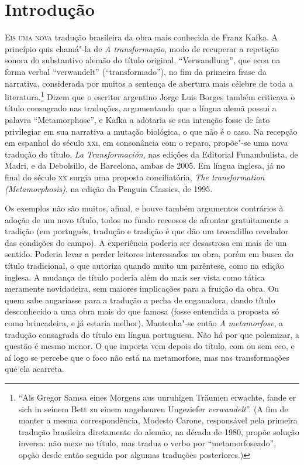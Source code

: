 
\chapter[Introdução, por Celso Donizete Cruz]{Introdução}

\textsc{Eis uma nova} tradução brasileira da obra mais conhecida de Franz Kafka.
A princípio quis chamá"-la de \textit{A transformação}, modo de
recuperar a repetição sonora do substantivo alemão do título original,
“Verwandlung”, que ecoa na forma verbal “verwandelt” (“transformado”),
no fim da primeira frase da narrativa, considerada por muitos a
sentença de abertura mais célebre de toda a literatura.\footnote{ “Als 
Gregor Samsa eines Morgens aus unruhigen
Träumen erwachte, fande er sich in seinem Bett zu einem ungeheuren
Ungeziefer \textit{verwandelt}”. (A fim de manter a mesma
correspondência, Modesto Carone, responsável pela primeira tradução
brasileira diretamente do alemão, na década de 1980,
propõe solução inversa: não mexe no título, mas traduz o verbo por
“metamorfoseado”, opção desde então seguida por algumas traduções
posteriores.)} Dizem que o escritor argentino Jorge Luis Borges também
criticava o título consagrado nas traduções, argumentando que a língua
alemã possui a palavra “Metamorphose”, e Kafka a adotaria se sua
intenção fosse de fato privilegiar em sua narrativa a mutação
biológica, o que não é o caso. Na recepção em espanhol do século \textsc{xxi}, em
consonância com o reparo, propõe"-se uma nova tradução do título,
\textit{La Transformación}, nas edições da Editorial Funambulista, de
Madri, e da Debolsillo, de Barcelona, ambas de 2005. Em língua inglesa,
já no final do século \textsc{xx} surgia uma proposta conciliatória, \textit{The
transformation (Metamorphosis)}, na edição da Penguin Classics, de
1995.

Os exemplos não são muitos, afinal, e houve também argumentos contrários
à adoção de um novo título, todos no fundo receosos de afrontar
gratuitamente a tradição (em português, tradução e tradição é que dão
um trocadilho revelador das condições do campo). A experiência poderia
ser desastrosa em mais de um sentido. Poderia levar a perder leitores
interessados na obra, porém em busca do título tradicional, o que
autoriza quando muito um parêntese, como na edição inglesa. A
mudança de título poderia além do mais ser vista como tática meramente
novidadeira, sem maiores implicações para a fruição da obra. Ou quem
sabe angariasse para a tradução a pecha de enganadora, dando título
desconhecido a uma obra mais do que famosa (fosse entendida a proposta
só como brincadeira, e já estaria melhor). Mantenha"-se então
\textit{A metamorfose}, a tradução consagrada do título em língua
portuguesa. Não há por que polemizar, a questão é mesmo menor. O que
importa vem depois do título, com ou sem eco, e aí logo se percebe que
o foco não está na metamorfose, mas nas transformações que ela
acarreta.

